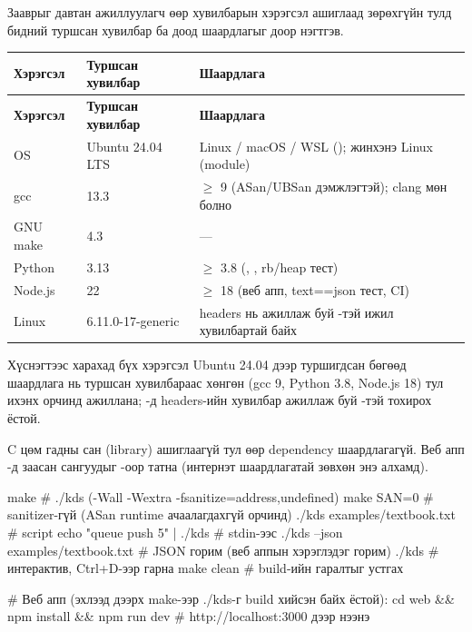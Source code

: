 Зааврыг давтан ажиллуулагч өөр хувилбарын хэрэгсэл ашиглаад зөрөхгүйн тулд бидний туршсан хувилбар ба доод шаардлагыг доор нэгтгэв.
\begin{longtable}{@{}L{45mm}L{50mm}L{58mm}@{}}
\textbf{Хэрэгсэл} & \textbf{Туршсан хувилбар} & \textbf{Шаардлага}\\
\endfirsthead
\textbf{Хэрэгсэл} & \textbf{Туршсан хувилбар} & \textbf{Шаардлага}\\
\endhead
OS & Ubuntu 24.04 LTS & Linux / macOS / WSL (); жинхэнэ Linux (module)\\
gcc & 13.3 & $\ge$ 9 (ASan/UBSan дэмжлэгтэй); clang мөн болно\\
GNU make & 4.3 & ---\\
Python & 3.13 & $\ge$ 3.8 (, , rb/heap тест)\\
Node.js & 22 & $\ge$ 18 (веб апп, text==json тест, CI)\\
Linux  & 6.11.0-17-generic & headers нь ажиллаж буй -тэй ижил хувилбартай байх\\
\end{longtable}
Хүснэгтээс харахад бүх хэрэгсэл Ubuntu 24.04 дээр туршигдсан бөгөөд шаардлага нь туршсан хувилбараас хөнгөн (gcc 9, Python 3.8, Node.js 18) тул ихэнх орчинд ажиллана; -д headers-ийн хувилбар ажиллаж буй -тэй тохирох ёстой.

C цөм гадны сан (library) ашиглаагүй тул өөр dependency шаардлагагүй. Веб апп -д заасан сангуудыг -оор татна (интернэт шаардлагатай зөвхөн энэ алхамд).

\begin{codeblock}
make                                   # ./kds (-Wall -Wextra -fsanitize=address,undefined)
make SAN=0                             # sanitizer-гүй (ASan runtime ачаалагдахгүй орчинд)
./kds examples/textbook.txt            # script
echo "queue push 5" | ./kds            # stdin-ээс
./kds --json examples/textbook.txt     # JSON горим (веб аппын хэрэглэдэг горим)
./kds                                  # интерактив, Ctrl+D-ээр гарна
make clean                             # build-ийн гаралтыг устгах

# Веб апп (эхлээд дээрх make-ээр ./kds-г build хийсэн байх ёстой):
cd web && npm install && npm run dev   # http://localhost:3000 дээр нээнэ
\end{codeblock}

